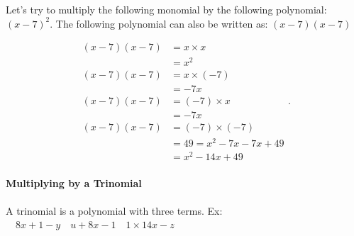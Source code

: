 \begin{example}
  \label{exm:multiplying_by_a_binomial}

  Let's try to multiply the following monomial by the following polynomial:
  $(x - 7)^{2}$. The following polynomial can also be written as: $(x - 7)(x - 7)$
  
  \begin{equation}
    \label{eqt:multiplying_by_a_binomial}
    \begin{split}
      (x - 7)(x - 7) &= x \times x \\
                        &= x^{2} \\
      (x - 7)(x - 7) &= x \times (-7) \\
                        &= -7x \\
      (x - 7)(x - 7) &= (-7) \times x \\
                        &= -7x \\
      (x - 7)(x - 7) &= (-7) \times (-7) \\
                        &= 49 = x^{2} - 7x - 7x + 49 \\
                        &= \boxed{x^{2} - 14x + 49}
    \end{split}
  .\end{equation}
\end{example}


\paragraph{Multiplying by a Trinomial}
\label{par:multiplying_by_a_trinomial}

\begin{definition}[Trinomial]
  \label{def:trinomial}

  A trinomial is a polynomial with three terms. Ex:
  $\quad 8x + 1 - y \quad u + 8x - 1 \quad 1 \times 14x - z$
\end{definition}

